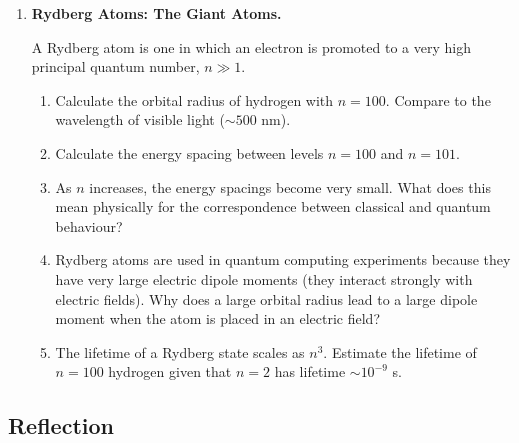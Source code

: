 \documentclass[12pt, a4paper]{book}
\begin{document}
\begin{deepbox}
\begin{enumerate}[label=\textbf{D\arabic*.}]
  \item \textbf{Rydberg Atoms: The Giant Atoms.}

        A Rydberg atom is one in which an electron is promoted
        to a very high principal quantum number, $n \gg 1$.

        \begin{enumerate}[label=(\alph*)]
          \item Calculate the orbital radius of hydrogen
                with $n = 100$. Compare to the wavelength
                of visible light ($\sim 500$ nm).
          \item Calculate the energy spacing between
                levels $n=100$ and $n=101$.
          \item As $n$ increases, the energy spacings become
                very small.
                What does this mean physically for the
                correspondence between classical and quantum
                behaviour?
          \item Rydberg atoms are used in quantum computing
                experiments because they have very large
                electric dipole moments (they interact
                strongly with electric fields).
                Why does a large orbital radius lead to a
                large dipole moment when the atom is placed
                in an electric field?
          \item The lifetime of a Rydberg state scales as $n^3$.
                Estimate the lifetime of $n=100$ hydrogen
                given that $n=2$ has lifetime $\sim 10^{-9}$ s.
        \end{enumerate}

\end{enumerate}
\end{deepbox}

\subsection*{Reflection}
\end{document}
